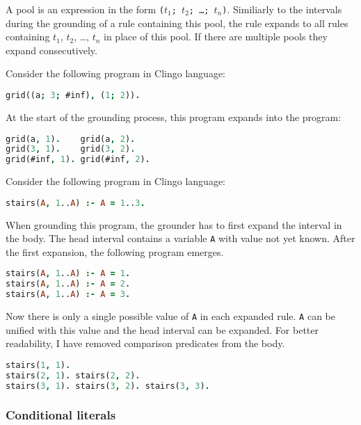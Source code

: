 A pool is an expression in the form \texttt{($t_1$; $t_2$; \ldots; $t_n$)}.
Similiarly to the intervals during the grounding of a rule containing this pool,
the rule expands to all rules containing $t_1$, $t_2$, \ldots, $t_n$ in place
of this pool. If there are multiple pools they expand consecutively.

\begin{example}
    Consider the following program in Clingo language:
    \begin{lstlisting}[language=prolog, numbers=none]
grid((a; 3; #inf), (1; 2)).
\end{lstlisting}
    At the start of the grounding process, this program expands into the program:
    \begin{lstlisting}[language=prolog, numbers=none]
grid(a, 1).    grid(a, 2).
grid(3, 1).    grid(3, 2).
grid(#inf, 1). grid(#inf, 2).
\end{lstlisting}
\end{example}

\begin{example}
    Consider the following program in Clingo language:
    \begin{lstlisting}[language=prolog, numbers=none]
stairs(A, 1..A) :- A = 1..3.
\end{lstlisting}
	When grounding this program, the grounder has to first expand the interval in the body.
    The head interval contains a variable \texttt{A} with value not yet known.
    After the first expansion, the following program emerges.
    \begin{lstlisting}[language=prolog, numbers=none]
stairs(A, 1..A) :- A = 1.
stairs(A, 1..A) :- A = 2.
stairs(A, 1..A) :- A = 3.
\end{lstlisting}
    Now there is only a single possible value of \texttt{A} in each expanded rule.
    \texttt{A} can be unified with this value and the head interval can be expanded.
    For better readability, I have removed comparison predicates from the body.
    \begin{lstlisting}[language=prolog, numbers=none]
stairs(1, 1).
stairs(2, 1). stairs(2, 2).
stairs(3, 1). stairs(3, 2). stairs(3, 3).
\end{lstlisting}
\end{example}

\subsubsection{Conditional literals}

